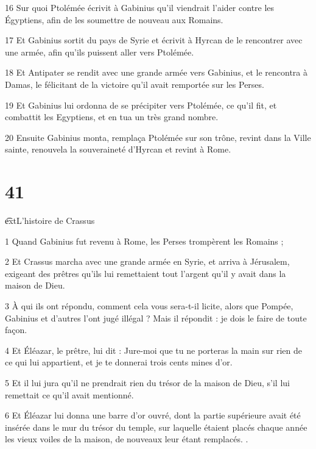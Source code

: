 \par 16 Sur quoi Ptolémée écrivit à Gabinius qu'il viendrait l'aider contre les Égyptiens, afin de les soumettre de nouveau aux Romains.

\par 17 Et Gabinius sortit du pays de Syrie et écrivit à Hyrcan de le rencontrer avec une armée, afin qu'ils puissent aller vers Ptolémée.

\par 18 Et Antipater se rendit avec une grande armée vers Gabinius, et le rencontra à Damas, le félicitant de la victoire qu'il avait remportée sur les Perses.

\par 19 Et Gabinius lui ordonna de se précipiter vers Ptolémée, ce qu'il fit, et combattit les Egyptiens, et en tua un très grand nombre.

\par 20 Ensuite Gabinius monta, remplaça Ptolémée sur son trône, revint dans la Ville sainte, renouvela la souveraineté d'Hyrcan et revint à Rome.


\chapter{41}

\par \t ext{L'histoire de Crassus}

\par 1 Quand Gabinius fut revenu à Rome, les Perses trompèrent les Romains ;

\par 2 Et Crassus marcha avec une grande armée en Syrie, et arriva à Jérusalem, exigeant des prêtres qu'ils lui remettaient tout l'argent qu'il y avait dans la maison de Dieu.

\par 3 À qui ils ont répondu, comment cela vous sera-t-il licite, alors que Pompée, Gabinius et d'autres l'ont jugé illégal ? Mais il répondit : je dois le faire de toute façon.

\par 4 Et Éléazar, le prêtre, lui dit : Jure-moi que tu ne porteras la main sur rien de ce qui lui appartient, et je te donnerai trois cents mines d'or.

\par 5 Et il lui jura qu'il ne prendrait rien du trésor de la maison de Dieu, s'il lui remettait ce qu'il avait mentionné.

\par 6 Et Éléazar lui donna une barre d'or ouvré, dont la partie supérieure avait été insérée dans le mur du trésor du temple, sur laquelle étaient placés chaque année les vieux voiles de la maison, de nouveaux leur étant remplacés. .

